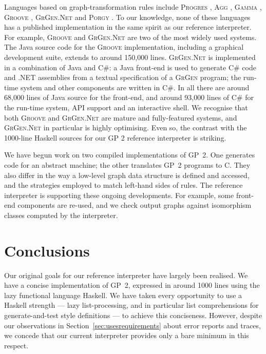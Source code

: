 Languages based on graph-transformation rules include
\textsc{Progres} \cite{Schuerr-Winter-Zuendorf99a},
\textsc{Agg} \cite{Ermel-Rudolf-Taentzer99a,Runge-Ermel-Taentzer11a},
\textsc{Gamma} \cite{Fradet-LeMetayer98a},
\textsc{Groove} \cite{Ghamarian-deMol-Rensink-Zambon-Zimakova12a},
\textsc{GrGen.Net} \cite{Jakumeit-Buchwald-Kroll10a} and
\textsc{Porgy} \cite{Fernandez-Kirchner-Mackie-Pinaud14a}.
To our knowledge, none of these languages has a published implementation in the same spirit as our reference interpreter. For example, \textsc{Groove} and \textsc{GrGen.Net} are two of the most widely used systems. The Java source code for the \textsc{Groove} implementation, including a graphical development suite, extends to around 150,000 lines. \textsc{GrGen.Net} is implemented in a combination of Java and C\#: a Java front-end is used to generate C\# code and .NET assemblies from a textual specification of a \textsc{GrGen} program; the run-time system and other components are written in C\#. In all there are around 68,000 lines of Java source for the front-end, and around 93,000 lines of C\# for the run-time system, API support and an interactive shell.
We recognise that both \textsc{Groove} and \textsc{GrGen.Net} are mature and fully-featured systems, and \textsc{GrGen.Net} in particular is highly optimising. Even so, the contrast with the 1000-line Haskell sources for our GP 2 reference interpreter is striking.

We have begun work on two compiled implementations of GP~2. One generates code for an abstract machine; the other translates GP~2 programs to C. They also differ in the way a low-level graph data structure is defined and accessed, and the strategies employed to match left-hand sides of rules. The reference interpreter is supporting these ongoing developments. For example, some front-end components are re-used, and we check output graphs against isomorphism classes
computed by the interpreter.

\section{Conclusions}
\label{sec:conclusions}


Our original goals for our reference interpreter have largely been realised.
We have a concise implementation of GP~2, expressed in around 1000 lines using
the lazy functional language Haskell.
We have taken every opportunity to use a Haskell strength --- lazy list-processing,
and in particular list comprehensions for generate-and-test style definitions ---
to achieve this conciseness.
However, despite our observations in Section~\ref{sec:usesrequirements} about error reports and traces,
we concede that our current interpreter provides only a bare minimum in this respect.

